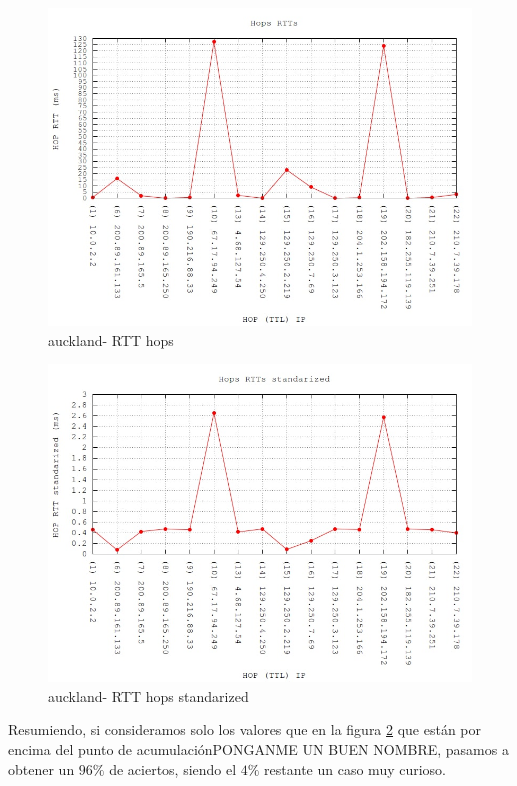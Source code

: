 \begin{figure}[!htbp]
  \centering
    \includegraphics[scale=0.6]{imagenes/auckland-graficos/traceroute-auckland.jpg}
  \caption{auckland- RTT hops}
  \label{fig:7}
\end{figure}

\begin{figure}[!htbp]
  \centering
    \includegraphics[scale=0.6]{imagenes/auckland-graficos/traceroute-auckland-standarized.jpg}
  \caption{auckland- RTT hops standarized}
  \label{fig:8}
\end{figure}


Resumiendo, si consideramos solo los valores que en la figura \ref{fig:8} que están por encima del punto de acumulaciónPONGANME UN BUEN NOMBRE, pasamos a obtener un $96\%$ de aciertos, siendo el $4\%$ restante un caso muy curioso.

